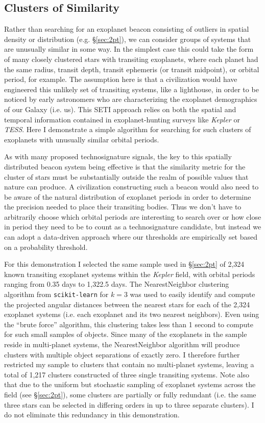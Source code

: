 \documentclass[twocolumn]{aastex62}
\newcommand{\Kepler}{\textsl{Kepler}\xspace}
\newcommand{\TESS}{\textsl{TESS}\xspace}
\begin{document}
\subsection{Clusters of Similarity}
\label{sec:sim}

Rather than searching for an exoplanet beacon consisting of outliers in spatial density or distribution (e.g. \S\ref{sec:2pt}), we can consider groups of systems that are unusually similar in some way. In the simplest case this could take the form of many closely clustered stars with transiting exoplanets, where each planet had the same radius, transit depth, transit ephemeris (or transit midpoint), or orbital period, for example. The assumption here is that a civilization would have engineered this unlikely set of transiting systems, like a lighthouse, in order to be noticed by early astronomers who are characterizing the exoplanet demographics of our Galaxy (i.e. us). This SETI approach relies on both the spatial and temporal information contained in exoplanet-hunting surveys like \Kepler or \TESS.
Here I demonstrate a simple algorithm for searching for such clusters of exoplanets with unusually similar orbital periods.


As with many proposed technosignature signals, the key to this spatially distributed beacon system being effective is that the similarity metric for the cluster of stars must be substantially outside the realm of possible values that nature can produce. A civilization constructing such a beacon would also need to be aware of the natural distribution of exoplanet periods in order to determine the precision needed to place their transiting bodies. Thus we don't have to arbitrarily choose which orbital periods are interesting to search over or how close in period they need to be to count as a technosignature candidate, but instead we can adopt a data-driven approach where our thresholds are empirically set based on a probability threshold. 

For this demonstration I selected the same sample used in \S\ref{sec:2pt} of 2,324 known transiting exoplanet systems within the \Kepler field, with orbital periods ranging from 0.35 days to 1,322.5 days. 
The NearestNeighbor clustering algorithm from {\tt scikit-learn} for $k=3$ was used to easily identify and compute the projected angular distances between the nearest stars for each of the 2,324 exoplanet systems (i.e. each exoplanet and its two nearest neighbors). Even using the ``brute force'' algorithm, this clustering takes less than 1 second to compute for such small samples of objects. Since many of the exoplanets in the sample reside in multi-planet systems, the NearestNeighbor algorithm will produce clusters with multiple object separations of exactly zero. I therefore further restricted my sample to clusters that contain no multi-planet systems, leaving a total of 1,217 clusters constructed of three single transiting systems. Note also that due to the uniform but stochastic sampling of exoplanet systems across the field (see \S\ref{sec:2pt}), some clusters are partially or fully redundant (i.e. the same three stars can be selected in differing orders in up to three separate clusters). I do not eliminate this redundancy in this demonstration.
\end{document}
